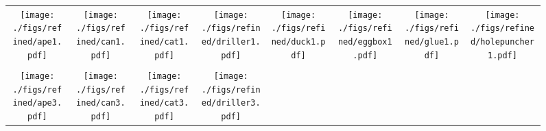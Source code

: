 \documentclass[10pt,twocolumn,letterpaper]{article}
\begin{document}
\begin{figure*}
\begin{center}
\hspace*{-0.5cm}
\begin{tabular}{cccccccc}
  \begin{minipage}{0.10\linewidth}
    \texttt{[image: ./figs/refined/ape1.pdf]}
  \end{minipage} &
  \begin{minipage}{0.10\linewidth}
    \texttt{[image: ./figs/refined/can1.pdf]}
  \end{minipage} &
  \begin{minipage}{0.10\linewidth}
    \texttt{[image: ./figs/refined/cat1.pdf]}
  \end{minipage} &
  \begin{minipage}{0.10\linewidth}
    \texttt{[image: ./figs/refined/driller1.pdf]}
  \end{minipage} &
  \begin{minipage}{0.10\linewidth}
    \texttt{[image: ./figs/refined/duck1.pdf]}
  \end{minipage} &
  \begin{minipage}{0.10\linewidth}
    \texttt{[image: ./figs/refined/eggbox1.pdf]}
  \end{minipage} & 
  \begin{minipage}{0.10\linewidth}
    \texttt{[image: ./figs/refined/glue1.pdf]}
  \end{minipage} &
  \begin{minipage}{0.10\linewidth}
    \texttt{[image: ./figs/refined/holepuncher1.pdf]}
  \end{minipage} \\ \\
    \begin{minipage}{0.10\linewidth}
    \texttt{[image: ./figs/refined/ape3.pdf]}
  \end{minipage} &
  \begin{minipage}{0.10\linewidth}
    \texttt{[image: ./figs/refined/can3.pdf]}
  \end{minipage} &
  \begin{minipage}{0.10\linewidth}
    \texttt{[image: ./figs/refined/cat3.pdf]}
  \end{minipage} &
  \begin{minipage}{0.10\linewidth}
    \texttt{[image: ./figs/refined/driller3.pdf]}
  \end{minipage} &

\end{tabular}
\end{center}
\end{figure*}
\end{document}
